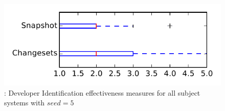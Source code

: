 
\begin{figure}
\centering
\includegraphics[height=0.4\textheight]{figures/dit_seed/rq1_tiny_5}
\caption{\rtwo: Developer Identification effectiveness measures for all subject systems with $seed=5$}
\label{fig:dit_seed:rq1:tiny}
\end{figure}
